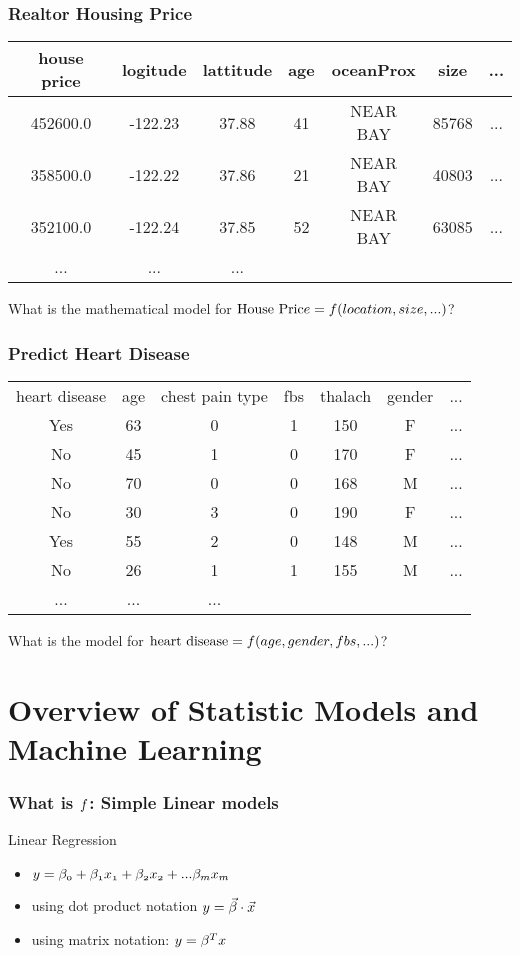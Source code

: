 \documentclass[notheorems, aspectratio=54]{beamer}
\begin{document}
\begin{frame}
\frametitle{Realtor Housing Price}
\begin{table}[]
\begin{tabular} { c c c c c c c}
house price &logitude & lattitude & age  &oceanProx &size &...\\ 
\hline
452600.0 &-122.23	&37.88	&41 	&NEAR BAY &85768 &...\\
358500.0 &-122.22	&37.86	&21		&NEAR BAY &40803 & ...\\
352100.0 &-122.24	&37.85	&52 	&NEAR BAY &63085 & ...\\
... & ... & ... & & & &
\end{tabular}
\end{table}

What is the mathematical model for $\text{House Pric}e=\mathnormal{f}(location, size,  ...)$?

\end{frame}

\begin{frame}
\frametitle{Predict Heart Disease}
\begin{table}[]
\begin{tabular} {c c c c c c c}
heart disease &age 	& chest pain type 	& fbs &thalach &gender &...\\ 
Yes		&63 	& 0 				&1 				&150		& F		&...\\
No 		&45 	& 1 				&0 				&170		&F		& ...\\
No 		&70 	& 0  				& 0  			&168		&M		& ...\\
No 		&30 	& 3 				&0 				&190		&F		& ...\\
Yes 	&55 	& 2 				& 0 			&148		&M		&...\\
No 		&26 	& 1 				& 1				&155	&M		&...\\
... & ... & ... & & & &
\end{tabular}
\end{table}
What is the model for $\text{heart disease}=\mathnormal{f}(age, gender, fbs,  ...)$?
\end{frame}


\section{Overview of Statistic Models and Machine Learning}

\begin{frame}
\frametitle{What is $\mathnormal{f}$: Simple Linear models}
Linear Regression
\begin{itemize}
\item $\mathnormal{y=\beta_0+\beta_1 x_1+ \beta_2 x_2 + ... \beta_m x_m}$
\item using dot product notation $\mathnormal{y=\vec{\beta}\cdot \vec{x}}$
\item using matrix notation: $\mathnormal{y=\beta^T x}$
\end{itemize}

\end{frame}
\end{document}
